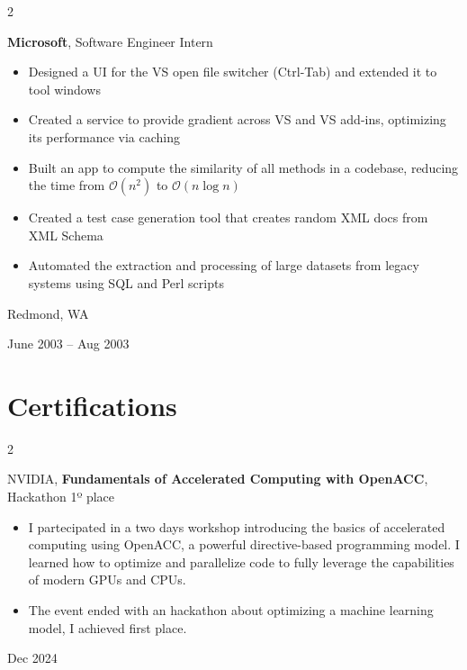 \documentclass[10pt, letterpaper]{article}
\newenvironment{highlights}{
    \begin{itemize}[
        topsep=0.10 cm,
        parsep=0.10 cm,
        partopsep=0pt,
        itemsep=0pt,
        leftmargin=0.4 cm + 10pt
    ]
}{
    \end{itemize}
} %
\newenvironment{twocolentry}[2][]{
    \onecolentry
    \def\secondColumn{#2}
    \setcolumnwidth{\fill, 4.5 cm}
    \begin{paracol}{2}
}{
    \switchcolumn \raggedleft \secondColumn
    \end{paracol}
    \endonecolentry
} %
\begin{document}
        \begin{twocolentry}{
            Redmond, WA

        June 2003 – Aug 2003
        }
            \textbf{Microsoft}, Software Engineer Intern
            \begin{highlights}
                \item Designed a UI for the VS open file switcher (Ctrl-Tab) and extended it to tool windows
                \item Created a service to provide gradient across VS and VS add-ins, optimizing its performance via caching
                \item Built an app to compute the similarity of all methods in a codebase, reducing the time from $\mathcal{O}(n^2)$ to $\mathcal{O}(n \log n)$
                \item Created a test case generation tool that creates random XML docs from XML Schema
                \item Automated the extraction and processing of large datasets from legacy systems using SQL and Perl scripts
            \end{highlights}
        \end{twocolentry}


\fi
    
    \section{Certifications}

        
        \begin{samepage}
            \begin{twocolentry}{
                Dec 2024
            }
                \mbox{NVIDIA}, \textbf{Fundamentals of Accelerated Computing with OpenACC}, Hackathon 1º place

                \vspace{0.10 cm}
                \begin{highlights}
                \item I partecipated in a two days workshop introducing the basics of accelerated computing using OpenACC, a powerful directive-based programming model. I learned how to optimize and parallelize code to fully leverage the capabilities of modern GPUs and CPUs.
                  \item The event ended with an hackathon about optimizing a machine learning model, I achieved first place.
                \end{highlights}
                \vspace{0.10 cm}

            \end{twocolentry}


              
        \end{samepage}
\end{document}
